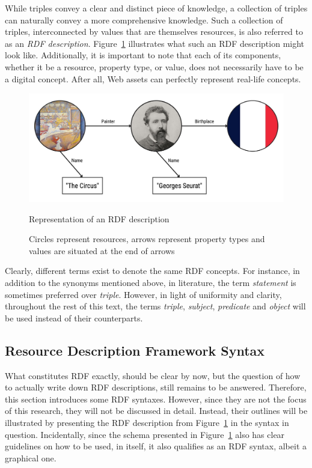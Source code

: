 While triples convey a clear and distinct piece of knowledge, a collection of triples can naturally convey a more comprehensive knowledge. Such a collection of triples, interconnected by values that are themselves resources, is also referred to as an \textit{RDF description}. Figure~\ref{fig:rdf_description} illustrates what such an RDF description might look like. Additionally, it is important to note that each of its components, whether it be a resource, property type, or value, does not necessarily have to be a digital concept. After all, Web assets can perfectly represent real-life concepts. \citep{miller1998introduction} \citep{candan2001resource}

\begin{figure}[htbp]
    \centering
	\includegraphics[width=\textwidth]{images/rdf_description.jpg}
    \captionsetup{justification=centering}
	\caption{Representation of an RDF description}
    \caption*{Circles represent resources, arrows represent property types and values are situated at the end of arrows}
	\label{fig:rdf_description}
\end{figure}

Clearly, different terms exist to denote the same RDF concepts. For instance, in addition to the synonyms mentioned above, in literature, the term \textit{statement} is sometimes preferred over \textit{triple}. However, in light of uniformity and clarity, throughout the rest of this text, the terms \textit{triple}, \textit{subject}, \textit{predicate} and \textit{object} will be used instead of their counterparts. \citep{candan2001resource}

\subsection{Resource Description Framework Syntax}
\label{subsec:rdf_syntax}

What constitutes RDF exactly, should be clear by now, but the question of how to actually write down RDF descriptions, still remains to be answered. Therefore, this section introduces some RDF syntaxes. However, since they are not the focus of this research, they will not be discussed in detail. Instead, their outlines will be illustrated by presenting the RDF description from Figure~\ref{fig:rdf_description} in the syntax in question. Incidentally, since the schema presented in Figure~\ref{fig:rdf_description} also has clear guidelines on how to be used, in itself, it also qualifies as an RDF syntax, albeit a graphical one. \citep{miller1998introduction}

